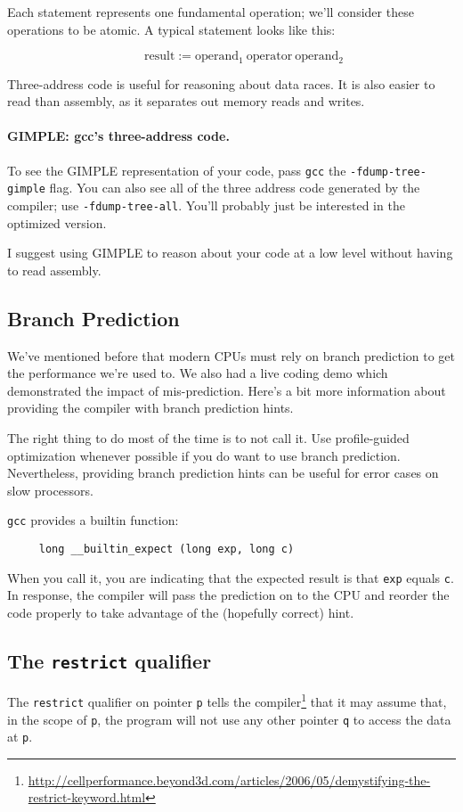 Each statement represents one fundamental operation; we'll consider
these operations to be atomic. A typical statement looks like this:

\[ \qquad \mbox{result} := \mbox{operand$_1$}\:\mbox{operator}\:\mbox{operand$_2$} \]

Three-address code is useful for reasoning about data races. It is
also easier to read than assembly, as it separates out memory reads
and writes.

\paragraph{GIMPLE: gcc's three-address code.} To see the GIMPLE representation 
of your code, pass {\tt gcc} the {\tt -fdump-tree-gimple} flag. You
can also see all of the three address code generated by the compiler;
use {\tt -fdump-tree-all}. You'll probably just be interested in the
optimized version.  

I suggest using GIMPLE to reason about your code at a low level
without having to read assembly.


\subsection*{Branch Prediction}
We've mentioned before that modern CPUs must rely on branch
prediction to get the performance we're used to. We also had a
live coding demo which demonstrated the impact of mis-prediction.
Here's a bit more information about providing the compiler with
branch prediction hints.

The right thing to do most of the time is to not call it. Use
profile-guided optimization whenever possible if you do want to use
branch prediction. Nevertheless, providing branch prediction hints
can be useful for error cases on slow processors.

{\tt gcc} provides a builtin function:

    \verb+     long __builtin_expect (long exp, long c)+

\noindent
When you call it, you are indicating that the expected result is that
{\tt exp} equals {\tt c}. In response, the compiler will pass the prediction
on to the CPU and reorder the code properly to take advantage of the
(hopefully correct) hint.

\subsection*{The {\tt restrict} qualifier} 
The {\tt restrict} qualifier on pointer {\tt p} tells
the compiler\footnote{\url{http://cellperformance.beyond3d.com/articles/2006/05/demystifying-the-restrict-keyword.html}} that it may assume that, in the scope of {\tt p},
the program will not use any other pointer {\tt q} to access the
data at {\tt *p}.


